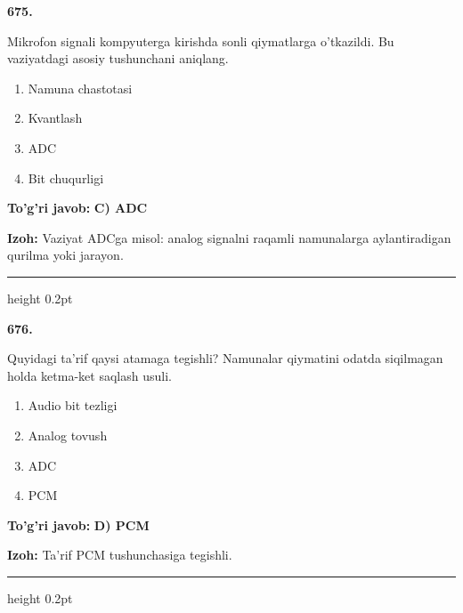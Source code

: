 \documentclass[10pt,a4paper,oneside]{article}
\begin{document}
\noindent\textbf{\color{ink}675.}
\par
Mikrofon signali kompyuterga kirishda sonli qiymatlarga o'tkazildi. Bu vaziyatdagi asosiy tushunchani aniqlang.
\begin{enumerate}[label=\Alph*),leftmargin=9mm]
\item Namuna chastotasi
\item Kvantlash
\item ADC
\item Bit chuqurligi
\end{enumerate}
\begin{tcolorbox}[enhanced,breakable,colback=teal!4,colframe=teal!50!black,boxrule=0.5pt,arc=1.1mm,left=3mm,right=3mm,top=1.7mm,bottom=1.7mm,before skip=2mm,after skip=2mm]
\textbf{\color{teal}To'g'ri javob:} \textbf{C) ADC}
\par\smallskip
\textbf{Izoh:} Vaziyat ADCga misol: analog signalni raqamli namunalarga aylantiradigan qurilma yoki jarayon.
\end{tcolorbox}
\vspace{2mm}\hrule height 0.2pt \vspace{3mm}

\noindent\textbf{\color{ink}676.}
\par
Quyidagi ta'rif qaysi atamaga tegishli? Namunalar qiymatini odatda siqilmagan holda ketma-ket saqlash usuli.
\begin{enumerate}[label=\Alph*),leftmargin=9mm]
\item Audio bit tezligi
\item Analog tovush
\item ADC
\item PCM
\end{enumerate}
\begin{tcolorbox}[enhanced,breakable,colback=teal!4,colframe=teal!50!black,boxrule=0.5pt,arc=1.1mm,left=3mm,right=3mm,top=1.7mm,bottom=1.7mm,before skip=2mm,after skip=2mm]
\textbf{\color{teal}To'g'ri javob:} \textbf{D) PCM}
\par\smallskip
\textbf{Izoh:} Ta'rif PCM tushunchasiga tegishli.
\end{tcolorbox}
\vspace{2mm}\hrule height 0.2pt \vspace{3mm}
\end{document}
